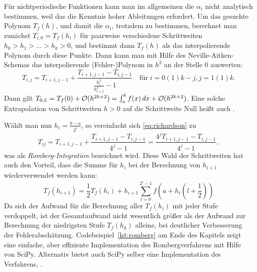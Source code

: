 Für nichtperiodische Funktionen kann man im allgemeinen die $\alpha_i$
nicht analytisch bestimmen, weil das die Kenntnis hoher Ableitungen
erfordert. Um das gesuchte Polynom $T_f(h)$, und damit die $\alpha_i$,
trotzdem zu bestimmen, berechnet man zunächst $T_{i,0}=T_f(h_i)$ für
paarweise verschiedene Schrittweiten $h_0>h_1>\ldots>h_k>0$, und
bestimmt dann $T_f(h)$ als das interpolierende Polynom durch diese
Punkte. Dann kann man mit Hilfe des Neville-Aitken-Schemas das
interpolierende (Fehler-)Polynom in $h^2$ an der Stelle $0$ auswerten:
\begin{equation}
  \label{eq:richardson}
  T_{i,j} = T_{i+1,j-1} + \frac{T_{i+1,j-1} -
    T_{i,j-1}}{\frac{h_i^2}{h_{i+j}^2} -1}
  \quad\text{für}\; i=0(1)k-j, j=1(1)k.
\end{equation}
Dann gilt $T_{0,k} = T_f(0) + \mathcal O(h^{2k+2}) = \int_a^b f(x)\,dx +
\mathcal O(h^{2k+2})$. Eine solche Extrapolation von Schrittweiten $h>0$ auf
die Schrittweite Null heißt auch
\emph{}.

Wählt man nun $h_i = \frac{b-a}{2^i}$, so vereinfacht sich
\eqref{eq:richardson} zu
\begin{equation}
  T_{ij} = T_{i+1,j-1} + \frac{T_{i+1,j-1} -
    T_{i,j-1}}{4^j - 1} = \frac{4^j T_{i+1,j-1} -
    T_{i,j-1}}{4^j - 1},
\end{equation}
was als \emph{Romberg-Integration} bezeichnet wird. Diese Wahl
der Schrittweiten hat auch den Vorteil, dass die Summe für $h_i$ bei
der Berechnung von $h_{i+1}$ wiederverwendet werden kann:
\begin{equation}
  T_f(h_{i+1}) = \frac{1}{2} T_f(h_i) +
  h_{i+1}\sum_{l=0}^{2^i-1} f\left(a + h_i\left(l
      + \frac{1}{2}\right)\right)
\end{equation}
Da sich der Aufwand für die Berechnung aller $T_f(h_i)$ mit jeder
Stufe verdoppelt, ist der Gesamtaufwand nicht wesentlich größer als
der Aufwand zur Berechnung der niedrigsten Stufe $T_f(h_k)$ alleine,
bei deutlicher Verbesserung der
Fehlerabschätzung. Codebeispiel~\ref{lst:romberg} am Ende des Kapitels
zeigt eine einfache, aber effiziente Implementation des
Rombergverfahrens mit Hilfe von SciPy. Alternativ bietet auch SciPy
selber eine Implementation des Verfahrens,
.


\afterpage{\clearpage}
  
